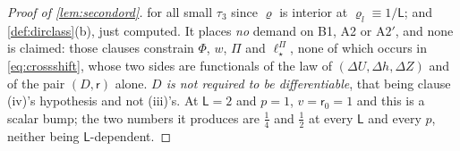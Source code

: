 \begin{proof}[Proof of \cref{lem:secondord}]
for all small $\tau_3$ since $\varrho$ is interior at $\varrho_l\equiv1/\mathsf L$; and
\cref{def:dirclass}(b), just computed. It places \emph{no} demand on B1, A2 or A$2'$, and none is
claimed: those clauses constrain $\Phi$, $w$, $\Pi$ and $\ell^\Pi_\star$, none of which occurs in
\eqref{eq:crossshift}, whose two sides are functionals of the law of $(\Delta U,\Delta h,\Delta Z)$ and
of the pair $(D,\mathsf r)$ alone. \emph{$D$ is not required to be differentiable}, that being clause
(iv)'s hypothesis and not (iii)'s. At $\mathsf L=2$ and $p=1$, $v=\mathsf r_0=1$ and this is a
scalar bump; the two numbers it produces are $\tfrac14$ and $\tfrac12$ at every $\mathsf L$ and every
$p$, neither being $\mathsf L$-dependent.

\end{proof}
